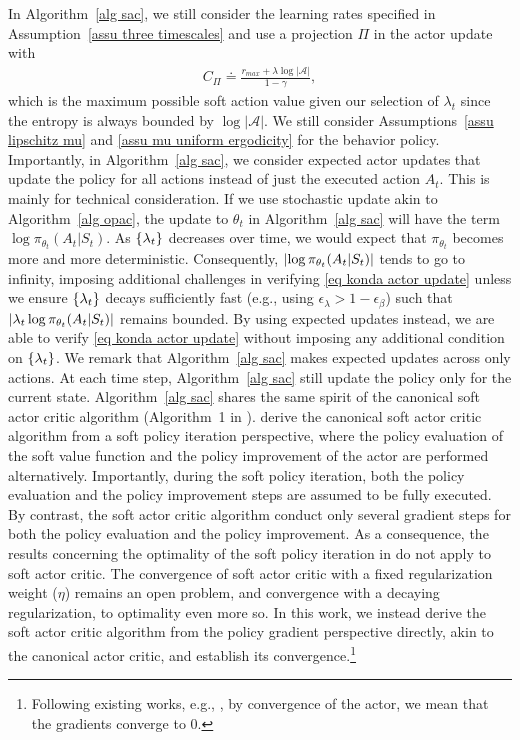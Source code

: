 \documentclass[twoside,11pt]{article}
\newcommand{\fA}{\mathcal{A}}
\newcommand{\na}{{|\fA|}}
\numberwithin{assucounter}{section}
\begin{document}
In Algorithm~\ref{alg sac},
we still consider the learning rates specified in Assumption~\ref{assu three timescales}
and use a projection $\Pi$ in the actor update with 
\begin{align}
  C_\Pi \doteq \frac{r_{max} + \lambda \log \na}{1-\gamma},
\end{align}
which is the maximum possible soft action value given our selection of $\lambda_t$ since the entropy is always bounded by $\log \na$.
We still consider Assumptions~\ref{assu lipschitz mu} and \ref{assu mu uniform ergodicity} for the behavior policy.
Importantly,
in Algorithm~\ref{alg sac},
we consider expected actor updates \citep{ciosek2017expected}
that update the policy for all actions instead of just the executed action $A_t$.
This is mainly for technical consideration.
If we use stochastic update akin to Algorithm~\ref{alg opac},
the update to $\theta_t$ in Algorithm~\ref{alg sac} will have the term $\log \pi_{\theta_t}(A_t|S_t)$.
As $\qty{\lambda_t}$ decreases over time,
we would expect that $\pi_{\theta_t}$ becomes more and more deterministic.
Consequently,
$\abs{\log\pi_{\theta_t}(A_t|S_t)}$ tends to go to infinity,
imposing additional challenges in verifying \eqref{eq konda actor update} unless we ensure $\qty{\lambda_t}$ decays sufficiently fast (e.g., using $\epsilon_\lambda > 1 - \epsilon_\beta$)
such that $\abs{\lambda_t \log\pi_{\theta_t}(A_t|S_t)}$ remains bounded.
By using expected updates instead,
we are able to verify \eqref{eq konda actor update} without imposing any additional condition on $\qty{\lambda_t}$.
We remark that Algorithm~\ref{alg sac} makes expected updates across only actions.
At each time step,
Algorithm~\ref{alg sac} still update the policy only for the current state.
Algorithm~\ref{alg sac} shares the same spirit of the canonical soft actor critic algorithm (Algorithm~1 in \citealt{haarnoja2018soft}).
\citet{haarnoja2018soft} derive the canonical soft actor critic algorithm from a soft policy iteration perspective,
where the policy evaluation of the soft value function 
and the policy improvement of the actor are performed alternatively.
Importantly,
during the soft policy iteration,
both the policy evaluation and the policy improvement steps
are assumed to be fully executed.
By contrast,
the soft actor critic algorithm conduct only several gradient steps for both the policy evaluation and the policy improvement.
As a consequence,
the results concerning the optimality of the soft policy iteration in \citet{haarnoja2018soft} do not apply to soft actor critic.
The convergence of soft actor critic with a fixed regularization weight ($\eta$) remains an open problem, 
and convergence with a decaying regularization, to optimality even more so.
In this work,
we instead derive the soft actor critic algorithm from the 
policy gradient 
perspective directly,
akin to the canonical actor critic,
and
establish its convergence.\footnote{Following existing works, e.g., \citet{konda2002thesis,zhang2019provably,wu2020finite,xu2021doubly},
by convergence of the actor,
we mean that the gradients converge to 0.}
\end{document}
